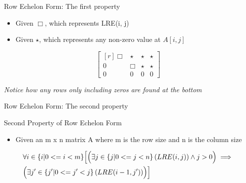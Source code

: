 \documentclass{beamer}
\begin{document}
\begin{frame}{Row Echelon Form: The first property}
  \begin{example}
    \begin{itemize}
      \item Given $\Box$, which represents LRE(i, j)
      \item Given $\star$, which represents any non-zero value at $A[i, j]$
    \end{itemize}
    \begin{equation}
      \begin{bmatrix*}[r]
        \Box & \star & \star & \star \\
        0 & \Box & \star & \star \\
        0 & 0 & 0 & 0 
      \end{bmatrix*}
    \end{equation}

    \textit{Notice how any rows only including zeros are found at the bottom}
  \end{example}
\end{frame}

\begin{frame}{Row Echelon Form: The second property}
  \begin{block}{Second Property of Row Echelon Form}
    \begin{itemize}
    \item Given an m x n matrix A where m is the row size and n is the column size
    \end{itemize}
    \begin{equation}
      \begin{split}
        &\forall i \in \{i | 0 <= i < m \} \Bigl[ \Bigl( \exists j \in \{j | 0 <= j < n \} \left( LRE(i, j) \right) \land j > 0 \Bigr)  \implies \Bigr. \\
        &\Bigl. \Bigl(\exists j^{\prime} \in \{ j^{\prime} | 0 <= j^{\prime} < j \} \left( LRE(i - 1, j^{\prime}) \right) \Bigr) \Bigr]
      \end{split}
    \end{equation}
  \end{block}
\end{frame}
\end{document}
